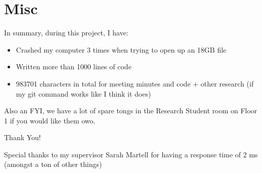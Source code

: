 \section{Misc}

In summary, during this project, I have:
\begin{itemize}
    \item Crashed my computer 3 times when trying to open up an 18GB file
    \item Written more than 1000 lines of code
    \item 983701 characters in total for meeting minutes and code + other research (if my git command works like I think it does)
\end{itemize}

Also an FYI, we have a lot of spare tongs in the Research Student room on Floor 1 if you would like them owo.
\begin{frame}
\begin{center}
\Huge Thank You!

Special thanks to my supervisor Sarah Martell for having a response time of 2 ms (amongst a ton of other things) 
\end{center}
\end{frame}